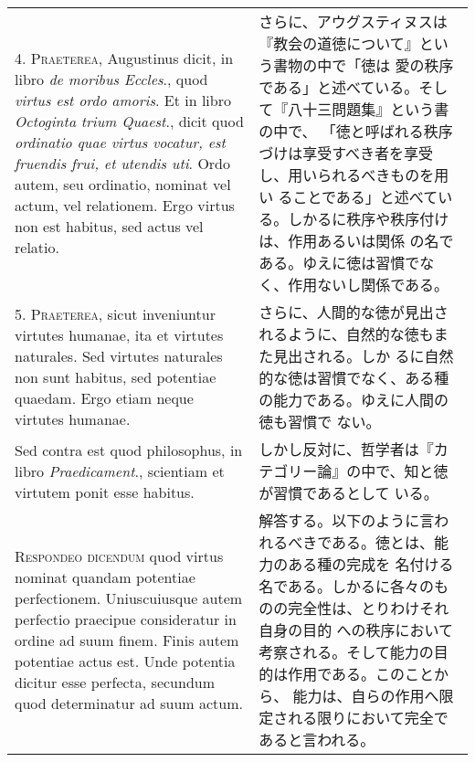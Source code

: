 \documentclass[10pt]{jsarticle}
\begin{document}
\begin{longtable}{p{21em}p{21em}}
\\

4. {\scshape Praeterea}, Augustinus dicit, in libro {\itshape de
moribus Eccles}., quod {\itshape virtus est ordo amoris}. Et in libro
{\itshape Octoginta trium Quaest}., dicit quod {\itshape ordinatio
quae virtus vocatur, est fruendis frui, et utendis uti}. Ordo autem,
seu ordinatio, nominat vel actum, vel relationem. Ergo virtus non est
habitus, sed actus vel relatio.

&

さらに、アウグスティヌスは『教会の道徳について』という書物の中で「徳は
愛の秩序である」と述べている。そして『八十三問題集』という書の中で、
「徳と呼ばれる秩序づけは享受すべき者を享受し、用いられるべきものを用い
ることである」と述べている。しかるに秩序や秩序付けは、作用あるいは関係
の名である。ゆえに徳は習慣でなく、作用ないし関係である。

\\

5. {\scshape Praeterea}, sicut inveniuntur virtutes humanae, ita et
virtutes naturales. Sed virtutes naturales non sunt habitus, sed
potentiae quaedam. Ergo etiam neque virtutes humanae.

&

さらに、人間的な徳が見出されるように、自然的な徳もまた見出される。しか
るに自然的な徳は習慣でなく、ある種の能力である。ゆえに人間の徳も習慣で
ない。

\\

Sed contra est quod philosophus, in libro {\itshape Praedicament}.,
scientiam et virtutem ponit esse habitus.

&

しかし反対に、哲学者は『カテゴリー論』の中で、知と徳が習慣であるとして
いる。

\\

{\scshape Respondeo dicendum} quod virtus nominat quandam potentiae
perfectionem. Uniuscuiusque autem perfectio praecipue consideratur in
ordine ad suum finem. Finis autem potentiae actus est. Unde potentia
dicitur esse perfecta, secundum quod determinatur ad suum actum.

&

解答する。以下のように言われるべきである。徳とは、能力のある種の完成を
名付ける名である。しかるに各々のものの完全性は、とりわけそれ自身の目的
への秩序において考察される。そして能力の目的は作用である。このことから、
能力は、自らの作用へ限定される限りにおいて完全であると言われる。


\end{longtable}
\end{document}

